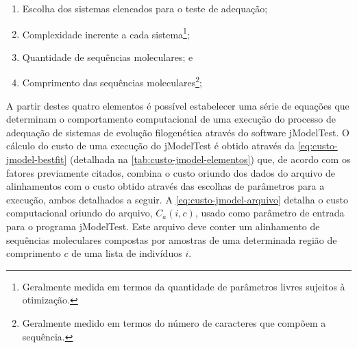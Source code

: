 \documentclass[english,brazilian]{UNISINOSmonografia} %
\begin{document}
\begin{enumerate}[label={\arabic*)}]
	\label{list:fatores-influenciam-performance}
	
	\item Escolha dos sistemas elencados para o teste de adequação;
	
	\item Complexidade inerente a cada sistema\footnote{
		Geralmente medida em termos da quantidade de parâmetros livres sujeitos à otimização.
	};
	
	\item Quantidade de sequências moleculares; e
	
	\item Comprimento das sequências moleculares\footnote{
		Geralmente medido em termos do número de caracteres que compõem a sequência.
	};
\end{enumerate}


A partir destes quatro elementos é possível estabelecer uma série de equações que determinam o comportamento computacional de uma execução do processo de adequação de sistemas de evolução filogenética através do software jModelTest.
O cálculo do custo de uma execução do jModelTest é obtido através da \autoref{eq:custo-jmodel-bestfit} (detalhada na \autoref{tab:custo-jmodel-elementos}) que, de acordo com os fatores previamente citados, combina o custo oriundo dos dados do arquivo de alinhamentos com o custo obtido através das escolhas de parâmetros para a execução, ambos detalhados a seguir.
A \autoref{eq:custo-jmodel-arquivo} detalha o custo computacional oriundo do arquivo, $ C_a(i,c) $, usado como parâmetro de entrada para o programa jModelTest. 
Este arquivo deve conter um alinhamento de sequências moleculares compostas por amostras de uma determinada região de comprimento $ c $ de uma lista de indivíduos $ i $.
\end{document}
